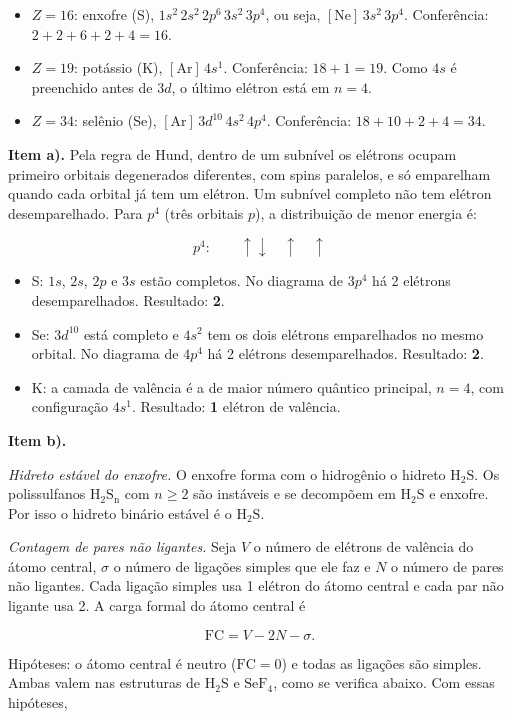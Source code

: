\documentclass{article}%
\begin{document}
\begin{itemize}
\item $Z=16$: enxofre (S), $1s^2\,2s^2\,2p^6\,3s^2\,3p^4$, ou seja, $[\mathrm{Ne}]\,3s^2\,3p^4$. Conferência: $2+2+6+2+4=16$.
\item $Z=19$: potássio (K), $[\mathrm{Ar}]\,4s^1$. Conferência: $18+1=19$. Como $4s$ é preenchido antes de $3d$, o último elétron está em $n=4$.
\item $Z=34$: selênio (Se), $[\mathrm{Ar}]\,3d^{10}\,4s^2\,4p^4$. Conferência: $18+10+2+4=34$.
\end{itemize}

\textbf{Item a).} Pela regra de Hund, dentro de um subnível os elétrons ocupam primeiro orbitais degenerados diferentes, com spins paralelos, e só emparelham quando cada orbital já tem um elétron. Um subnível completo não tem elétron desemparelhado. Para $p^4$ (três orbitais $p$), a distribuição de menor energia é:

\[
p^4:\qquad \uparrow\downarrow\quad \uparrow\quad \uparrow
\]

\begin{itemize}
\item S: $1s$, $2s$, $2p$ e $3s$ estão completos. No diagrama de $3p^4$ há 2 elétrons desemparelhados. Resultado: \textbf{2}.
\item Se: $3d^{10}$ está completo e $4s^2$ tem os dois elétrons emparelhados no mesmo orbital. No diagrama de $4p^4$ há 2 elétrons desemparelhados. Resultado: \textbf{2}.
\item K: a camada de valência é a de maior número quântico principal, $n=4$, com configuração $4s^1$. Resultado: \textbf{1} elétron de valência.
\end{itemize}

\textbf{Item b).} 

\textit{Hidreto estável do enxofre.} O enxofre forma com o hidrogênio o hidreto $\mathrm{H_2S}$. Os polissulfanos $\mathrm{H_2S_n}$ com $n\geq 2$ são instáveis e se decompõem em $\mathrm{H_2S}$ e enxofre. Por isso o hidreto binário estável é o $\mathrm{H_2S}$.

\textit{Contagem de pares não ligantes.} Seja $V$ o número de elétrons de valência do átomo central, $\sigma$ o número de ligações simples que ele faz e $N$ o número de pares não ligantes. Cada ligação simples usa 1 elétron do átomo central e cada par não ligante usa 2. A carga formal do átomo central é

\[
\mathrm{FC}=V-2N-\sigma .
\]

Hipóteses: o átomo central é neutro ($\mathrm{FC}=0$) e todas as ligações são simples. Ambas valem nas estruturas de $\mathrm{H_2S}$ e $\mathrm{SeF_4}$, como se verifica abaixo. Com essas hipóteses,
\end{document}
